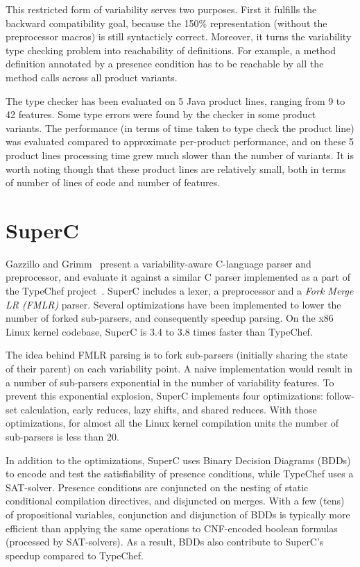 \documentclass[11pt]{article}
\newcommand{\term}[1] {\emph{#1}}
\begin{document}
This restricted form of variability serves two purposes. First it fulfills the backward compatibility goal, because the 150\% representation (without the preprocessor macros) is still syntacticly correct. Moreover, it turns the variability type checking problem into reachability of definitions. For example, a method definition annotated by a presence condition has to be reachable by all the method calls across all product variants. 
 
The type checker has been evaluated on 5 Java product lines, ranging from 9 to 42 features. Some type errors were found by the checker in some product variants. The performance (in terms of time taken to type check the product line) was evaluated compared to approximate per-product performance, and on these 5 product lines processing time grew much slower than the number of variants. It is worth noting though that these product lines are relatively small, both in terms of number of lines of code and number of features. 

\section{SuperC}
Gazzillo and Grimm~\cite{Gazzillo:2012} present a variability-aware C-language parser and preprocessor, and evaluate it against a similar C parser implemented as a part of the TypeChef project~\cite{Kastner:2011, Kastner:2012}. SuperC includes a lexer, a preprocessor and a \term{Fork Merge LR (FMLR)} parser. Several optimizations have been implemented to lower the number of forked sub-parsers, and consequently speedup parsing. On the x86 Linux kernel codebase, SuperC is 3.4 to 3.8 times faster than TypeChef.

The idea behind FMLR parsing is to fork sub-parsers (initially sharing the state of their parent) on each variability point. A naive implementation would result in a number of sub-parsers exponential in the number of variability features. To prevent this exponential explosion, SuperC implements four optimizations: follow-set calculation, early reduces, lazy shifts, and shared reduces. With those optimizations, for almost all the Linux kernel compilation units the number of sub-parsers is less than 20.

In addition to the optimizations, SuperC uses Binary Decision Diagrams (BDDs) to encode and test the satisfiability of presence conditions, while TypeChef uses a SAT-solver. Presence conditions are conjuncted on the nesting of static conditional compilation directives, and disjuncted on merges. With a few (tens) of propositional variables, conjunction and disjunction of BDDs is typically more efficient than applying the same operations to CNF-encoded boolean formulas (processed by SAT-solvers). As a result, BDDs also contribute to SuperC's speedup compared to TypeChef.
\end{document}
